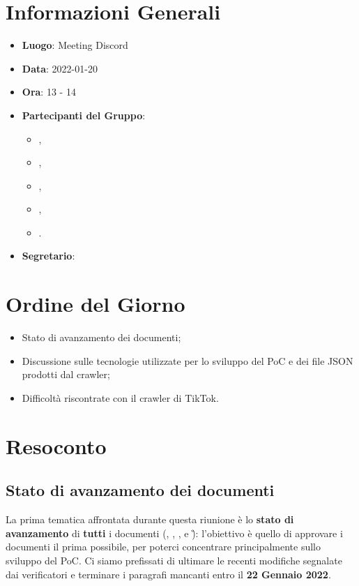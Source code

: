 \section{Informazioni Generali}

\begin{itemize}
\item{\textbf{Luogo}}: Meeting Discord
\item{\textbf{Data}}: 2022-01-20
\item{\textbf{Ora}}: 13 - 14
\item{\textbf{Partecipanti del Gruppo}}: 
	\begin{itemize}
	\item{\EP{},} 
	\item{\FP{},}
	\item{\GC{},}
	\item{\LW{},}
	\item{\MG{}.}
	\end{itemize} 
\item{\textbf{Segretario}}: \GC{}	
\end{itemize}

\section{Ordine del Giorno}
\begin{itemize}
\item{Stato di avanzamento dei documenti;}
\item{Discussione sulle tecnologie utilizzate per lo sviluppo del PoC e dei file JSON prodotti dal crawler;}
\item{Difficoltà riscontrate con il crawler di TikTok.}
\end{itemize}

\section{Resoconto}

\subsection{Stato di avanzamento dei documenti}

La prima tematica affrontata durante questa riunione è lo \textbf{stato di avanzamento} di \textbf{tutti} i documenti (\AdR, \NdP, \PdP, \PdQ e \G): l'obiettivo è quello di approvare i documenti il prima possibile, per poterci concentrare principalmente sullo sviluppo del PoC. Ci siamo prefissati di ultimare le recenti modifiche segnalate dai verificatori e terminare i paragrafi mancanti entro il \textbf{22 Gennaio 2022}.


